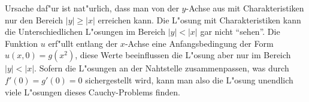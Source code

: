 {\begin{loesung}
Ursache daf"ur ist nat"urlich, dass man von der $y$-Achse aus mit
Charakteristiken nur den Bereich $|y|\ge |x|$ erreichen kann.
Die L"osung mit Charakteristiken kann die Unterschiedlichen L"osungen
im Bereich $|y|<|x|$ gar nicht ``sehen''.
Die Funktion $u$ erf"ullt entlang der $x$-Achse eine Anfangsbedingung
der Form $u(x,0)=g(x^2)$, diese Werte beeinflussen die L"osung aber
nur im Bereich $|y|<|x|$. Sofern die L"osungen an der Nahtstelle
zusammenpassen, was durch $f'(0)=g'(0)=0$ sichergestellt wird,
kann man also die L"osung unendlich viele L"osungen dieses Cauchy-Problems
finden.
\end{loesung}
}{}

